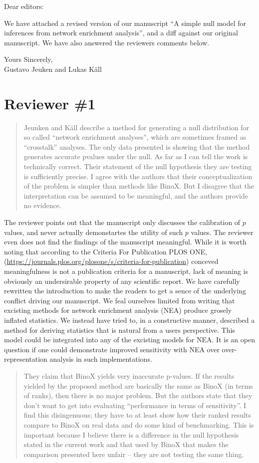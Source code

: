 \documentclass[a4paper]{article}
\newcommand{\breview}{\begin{quotation}\begin{bf}\noindent}
\newcommand{\ereview}{\end{bf}\end{quotation}}
\begin{document}
Dear editors:

We have attached a revised version of our manuscript ``A simple null model for inferences from network enrichment analysis'', and a diff
against our original manuscript. We have also answered the reviewers comments
below.

Yours Sincerely,\\[1.5cm]
Gustavo Jeuken and
Lukas K\"{a}ll
\\


\section*{Reviewer \#1}
\breview
Jeunken and Käll describe a method for generating a null distribution for so called ``network enrichment analyses'', which are sometimes framed as ``crosstalk'' analyses. The only data presented is showing that the method generates accurate pvalues under the null.
\medskip
As far as I can tell the work is technically correct. Their statement of the null hypothesis they are testing is sufficiently precise. I agree with the authors that their conceptualization of the problem is simpler than methods like BinoX. But I disagree that the interpretation can be assumed to be meaningful, and the authors provide no evidence.
\ereview
The reviewer points out that the manuscript only discusses the calibration of $p$ values, and never actually demonstartes the utility of such $p$ values. The reviewer even does not find the findings of the manuscript meaningful. While it is worth noting that  according to the Criteria For Publication PLOS ONE, (\url{https://journals.plos.org/plosone/s/criteria-for-publication}) conceved meaningfulness is not a publication criteria for a manuscript, lack of meaning is obviously an undersirable property of any scientific report. We have carefully rewritten the introduction to make the readers to get a sence of the underlying conflict driving our manuscript. We feal ourselves limited from writing that excisting methods for network enrichment analysis (NEA) produce grosely inflated statistics. We instead have tried to, in a constructive manner, described a method for deriving statistics that is natural from a users perspective. This model could be integrated into any of the excisting models for NEA. It is an open question if one could demonstrate improved sensitivity with NEA over over-representation analysis in such implementations.

\breview
They claim that BinoX yields very inaccurate p-values. If the results yielded by the proposed method are basically the same as BinoX (in terms of ranks), then there is no major problem. But the authors state that they don’t want to get into evaluating “performance in terms of sensitivity”. I find this disingenuous; they have to at least show how their ranked results compare to BinoX on real data and do some kind of benchmarking. This is important because I believe there is a difference in the null hypothesis stated in the current work and that used by BinoX that makes the comparison presented here unfair -- they are not testing the same thing.
\ereview
\end{document}
